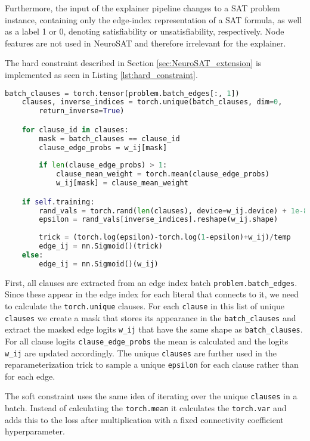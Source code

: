 Furthermore, the input of the explainer pipeline changes to a SAT problem instance, containing only the edge-index representation of a SAT formula, as well as a label 1 or 0, denoting satisfiability or unsatisfiability, respectively. Node features are not used in NeuroSAT and therefore irrelevant for the explainer. \bigskip

The hard constraint described in Section \ref{sec:NeuroSAT_extension} is implemented as seen in Listing \ref{lst:hard_constraint}.

\begin{lstlisting}[language=Python, caption=Implementation of Hard Constraint., label=lst:hard_constraint]
    batch_clauses = torch.tensor(problem.batch_edges[:, 1])
    clauses, inverse_indices = torch.unique(batch_clauses, dim=0, 
        return_inverse=True)

    for clause_id in clauses:
        mask = batch_clauses == clause_id
        clause_edge_probs = w_ij[mask]
        
        if len(clause_edge_probs) > 1:
            clause_mean_weight = torch.mean(clause_edge_probs)
            w_ij[mask] = clause_mean_weight

    if self.training:
        rand_vals = torch.rand(len(clauses), device=w_ij.device) + 1e-8
        epsilon = rand_vals[inverse_indices].reshape(w_ij.shape)
        
        trick = (torch.log(epsilon)-torch.log(1-epsilon)+w_ij)/temp
        edge_ij = nn.Sigmoid()(trick)    
    else:
        edge_ij = nn.Sigmoid()(w_ij)
\end{lstlisting}

First, all clauses are extracted from an edge index batch \lstinline|problem.batch_edges|. Since these appear in the edge index for each literal that connects to it, we need to calculate the \lstinline|torch.unique| clauses. For each \lstinline|clause| in this list of unique \lstinline|clauses| we create a mask that stores its appearance in the \lstinline|batch_clauses| and extract the masked edge logits \lstinline|w_ij| that have the same shape as \lstinline|batch_clauses|. For all clause logits \lstinline|clause_edge_probs| the mean is calculated and the logits \lstinline|w_ij| are updated accordingly.
The unique \lstinline|clauses| are further used in the reparameterization trick to sample a unique \lstinline|epsilon| for each clause rather than for each edge.

The soft constraint uses the same idea of iterating over the unique \lstinline|clauses| in a batch. Instead of calculating the \lstinline|torch.mean| it calculates the \lstinline|torch.var| and adds this to the loss after multiplication with a fixed connectivity coefficient hyperparameter. \bigskip


